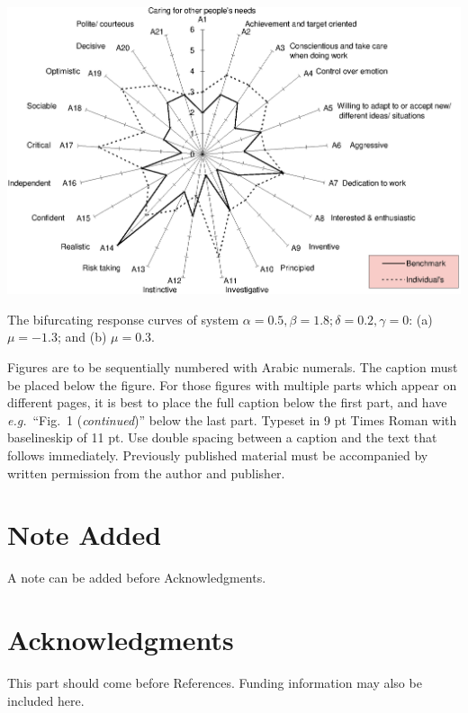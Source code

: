 \documentclass{ws-jai}
\begin{document}
\begin{rotatefigure}
\begin{center}
\includegraphics[width=7in]{jaif2}
\end{center}
\caption{The bifurcating response curves of system
$\alpha=0.5, \beta=1.8; \delta=0.2, \gamma=0$: (a)
$\mu=-1.3$; and (b) $\mu=0.3$.}
\label{aba:fig2}
\end{rotatefigure}

Figures are to be sequentially numbered with Arabic
numerals. The caption must be placed below the figure. For those
figures with multiple parts which appear on different pages, it is
best to place the full caption below the first part, and have
{\it e.g.}~``Fig.~1 ({\it continued})'' below the last part. Typeset in
9 pt Times Roman with baselineskip of 11 pt. Use double spacing
between a caption and the text that follows immediately.
Previously published material must be accompanied by written
permission from the author and publisher.

\section*{Note Added}
A note can be added before Acknowledgments.

\section*{Acknowledgments}
This part should come before References. Funding information may also be included here.





\end{document}
